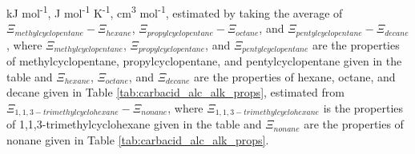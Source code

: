\begin{table}
\begin{adjustbox}{width=\linewidth,keepaspectratio}
\begin{threeparttable}
\begin{tablenotes}
     kJ mol\textsuperscript{-1},
     J mol\textsuperscript{-1} K\textsuperscript{-1},
     cm\textsuperscript{3} mol\textsuperscript{-1},
     estimated by taking the average of $\Xi_{methylcyclopentane} - \Xi_{hexane}$, $\Xi_{propylcyclopentane} - \Xi_{octane}$, and $\Xi_{pentylcyclopentane} - \Xi_{decane}$, where $\Xi_{methylcyclopentane}$, $\Xi_{propylcyclopentane}$, and $\Xi_{pentylcyclopentane}$ are the properties of methylcyclopentane, propylcyclopentane, and pentylcyclopentane given in the table and $\Xi_{hexane}$, $\Xi_{octane}$, and $\Xi_{decane}$ are the properties of hexane, octane, and decane given in Table \ref{tab:carbacid_alc_alk_props},
     estimated from $\Xi_{1,1,3-trimethylcyclohexane} - \Xi_{nonane}$, where $\Xi_{1,1,3-trimethylcyclohexane}$ is the properties of 1,1,3-trimethylcyclohexane given in the table and $\Xi_{nonane}$ are the properties of nonane given in Table \ref{tab:carbacid_alc_alk_props}.
    
        
  \end{tablenotes}
  
  \label{tab:ring}
  \end{threeparttable}
  \end{adjustbox}
\end{table}
\setcounter{tabcounter}{0} %
\doublespace







